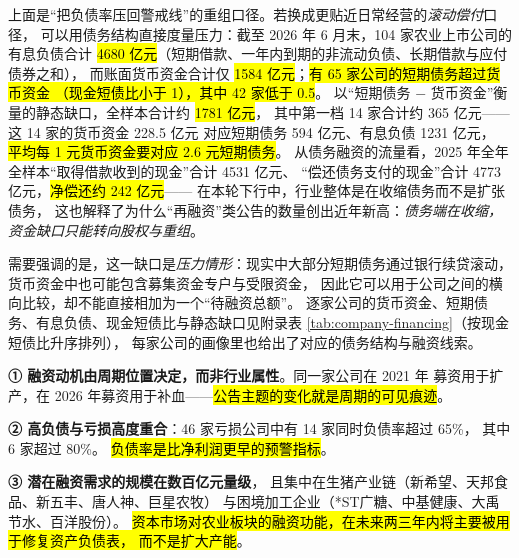 上面是“把负债率压回警戒线”的重组口径。若换成更贴近日常经营的\emph{滚动偿付}口径，
可以用债务结构直接度量压力：截至 2026 年 6 月末，\num{104} 家农业上市公司的有息负债合计
\hl{\num{4680} 亿元}（短期借款、一年内到期的非流动负债、长期借款与应付债券之和），
而账面货币资金合计仅 \hl{\num{1584} 亿元}；\hl{有 \num{65} 家公司的短期债务超过货币资金
（现金短债比小于 \num{1}），其中 \num{42} 家低于 \num{0.5}}。
以“短期债务 $-$ 货币资金”衡量的静态缺口，全样本合计约 \hl{\num{1781} 亿元}，
其中第一档 \num{14} 家合计约 \num{365} 亿元——这 \num{14} 家的货币资金 \num{228.5} 亿元
对应短期债务 \num{594} 亿元、有息负债 \num{1231} 亿元，
\hl{平均每 1 元货币资金要对应 2.6 元短期债务}。
从债务融资的流量看，2025 年全年全样本“取得借款收到的现金”合计 \num{4531} 亿元、
“偿还债务支付的现金”合计 \num{4773} 亿元，\hl{净偿还约 \num{242} 亿元}——
在本轮下行中，行业整体是在收缩债务而不是扩张债务，
这也解释了为什么“再融资”类公告的数量创出近年新高：\emph{债务端在收缩，}
\emph{资金缺口只能转向股权与重组}。

需要强调的是，这一缺口是\emph{压力情形}：现实中大部分短期债务通过银行续贷滚动，
货币资金中也可能包含募集资金专户与受限资金，
因此它可以用于公司之间的横向比较，却不能直接相加为一个“待融资总额”。
逐家公司的货币资金、短期债务、有息负债、现金短债比与静态缺口见附录表
\ref{tab:company-financing}（按现金短债比升序排列），
每家公司的画像里也给出了对应的债务结构与融资线索。

\begin{keybox}[融资需求分析的三个结论]
\normalsize
\textbf{① 融资动机由周期位置决定，而非行业属性}。同一家公司在 2021 年
募资用于扩产，在 2026 年募资用于补血——\hl{公告主题的变化就是周期的可见痕迹}。\par\vspace{3pt}
\textbf{② 高负债与亏损高度重合}：\num{46} 家亏损公司中有 \num{14} 家同时负债率超过 \num{65}\%，
其中 \num{6} 家超过 \num{80}\%。
\hl{负债率是比净利润更早的预警指标}。\par\vspace{3pt}
\textbf{③ 潜在融资需求的规模在数百亿元量级}，
且集中在生猪产业链（新希望、天邦食品、新五丰、唐人神、巨星农牧）
与困境加工企业（*ST广糖、中基健康、大禹节水、百洋股份）。
\hl{资本市场对农业板块的融资功能，在未来两三年内将主要被用于修复资产负债表，
而不是扩大产能}。
\end{keybox}
